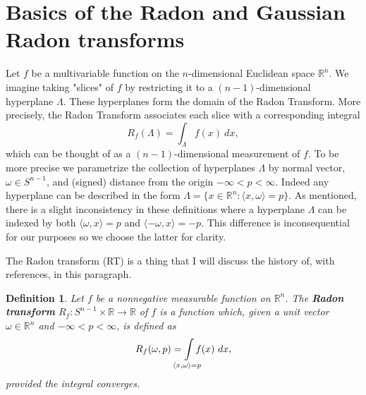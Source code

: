 \documentclass{amsart}
\newtheorem{definition}[theorem]{Definition}
\theoremstyle{remark}
\numberwithin{equation}{section}
\newcommand{\RR}{\mathbb{R}}
\def\mclimits_#1{\limits_{\mathclap{#1}}}
\begin{document}


 
    

\newpage
\section{Basics of the Radon and Gaussian Radon transforms}

Let $f$ be a multivariable function on the $n$-dimensional Euclidean space $\RR^n$. We imagine taking "slices" of $f$ by restricting it to a $(n-1)$-dimensional hyperplane $\Lambda$. These hyperplanes form the domain of the Radon Transform. More precisely, the Radon Transform associates each slice with a corresponding integral
\[
    R_f(\Lambda) = \int_{\Lambda} f(x) ~dx,
\]
which can be thought of as a $(n-1)$-dimensional measurement of $f$. To be more precise we parametrize the collection of hyperplanes $\Lambda$ by normal vector, $\omega \in S^{n-1}$, and (signed) distance from the origin $-\infty < p < \infty$. Indeed any hyperplane can be described in the form $\Lambda = \{x \in \RR^n: \langle x, \omega\rangle = p\}$. As mentioned, there is a slight inconsistency in these definitions where a hyperplane $\Lambda$ can be indexed by both $\langle \omega, x \rangle = p$ and $\langle -\omega, x \rangle = -p$. This difference is inconsequential for our purposes so we choose the latter for clarity.

The Radon transform \cite{Helg65} (RT) is a thing that I will discuss the history of, with references, in this paragraph.

\begin{definition}
    Let $f$ be a nonnegative measurable function on $\mathbb{R}^n$. The \textbf{Radon transform} $R_f : S^{n-1} \times \RR \rightarrow \RR$ of $f$ is a function which, given a unit vector $\omega \in \RR^n$ and $-\infty < p < \infty$, is defined as
    \[
        R_f(\omega, p) = \int\mclimits_{\langle x, \omega \rangle = p} f(x) ~dx,
    \]
    provided the integral converges.
\end{definition}
\end{document}
